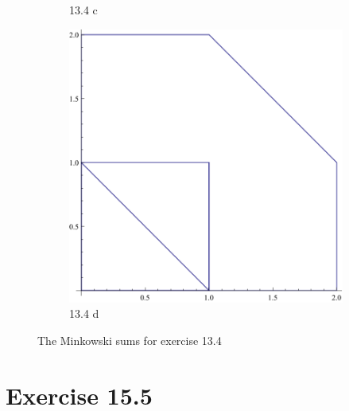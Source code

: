 \documentclass[11pt,a4paper]{article}
\begin{document}
\begin{figure}
\begin{subfigure}[b]{.4\textwidth}
        \caption{13.4 c}
    \end{subfigure}
    \begin{subfigure}[b]{.4\textwidth}
        \includegraphics[width=\textwidth]{ex13-4-d.pdf}
        \caption{13.4 d}
    \end{subfigure}
    \caption{The Minkowski sums for exercise 13.4}
    \label{ex13.4}
\end{figure}

\section{Exercise 15.5}

\end{document}
